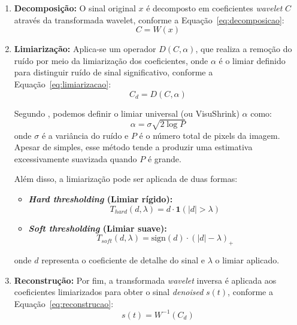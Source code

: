 \begin{enumerate}
    \item \textbf{Decomposição:} O sinal original \( x \) é decomposto em coeficientes \textit{wavelet} \( C \) através da transformada wavelet, conforme a Equação~\eqref{eq:decomposicao}:
    \begin{equation}
    C = W(x)
    \label{eq:decomposicao}
    \end{equation}

    \item \textbf{Limiarização:} Aplica-se um operador \( D(C, \alpha) \), que realiza a remoção do ruído por meio da limiarização dos coeficientes, onde \( \alpha \) é o limiar definido para distinguir ruído de sinal significativo, conforme a Equação~\eqref{eq:limiarizacao}:
    \begin{equation}
    C_d = D(C, \alpha)
    \label{eq:limiarizacao}
    \end{equation}

Segundo \textcite{Mupparaju2013}, podemos definir o limiar universal (ou VisuShrink) \( \alpha \) como:
    \begin{equation}
    \alpha = \sigma \sqrt{2 \log P}
    \label{eq:visu}
    \end{equation}
    onde \( \sigma \) é a variância do ruído e \( P \) é o número total de pixels da imagem. Apesar de simples, esse método tende a produzir uma estimativa excessivamente suavizada quando \( P \) é grande.

    Além disso, a limiarização pode ser aplicada de duas formas:

    \begin{itemize}
        \item \textbf{\textit{Hard thresholding} (Limiar rígido):}
        \begin{equation}
        T_{hard}(d, \lambda) = d \cdot \mathbf{1}(|d| > \lambda)
        \label{eq:hard}
        \end{equation}

        \item \textbf{\textit{Soft thresholding} (Limiar suave):}
        \begin{equation}
        T_{soft}(d, \lambda) = \mathrm{sign}(d) \cdot (|d| - \lambda)_+
        \label{eq:soft}
        \end{equation}
    \end{itemize}
    onde \( d \) representa o coeficiente de detalhe do sinal e \( \lambda \) o limiar aplicado.

    \item \textbf{Reconstrução:} Por fim, a transformada \textit{wavelet} inversa é aplicada aos coeficientes limiarizados para obter o sinal \textit{denoised} \( s(t) \), conforme a Equação~\eqref{eq:reconstrucao}:
    \begin{equation}
    s(t) = W^{-1}(C_d)
    \label{eq:reconstrucao}
    \end{equation}
\end{enumerate}

